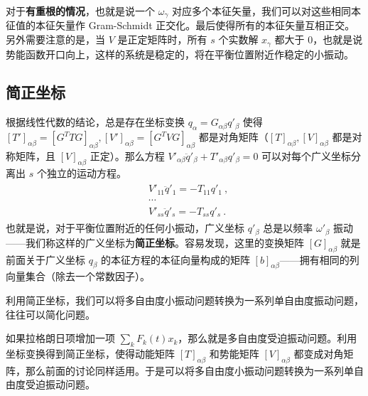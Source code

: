 对于\textbf{有重根的情况}，也就是说一个 $\omega_\gamma$ 对应多个本征矢量，我们可以对这些相同本征值的本征矢量作 Gram-Schmidt 正交化。最后使得所有的本征矢量互相正交。另外需要注意的是，当 $V$ 是正定矩阵时，所有 $s$ 个实数解 $x_\gamma$ 都大于 $0$，也就是说势能函数开口向上，这样的系统是稳定的，将在平衡位置附近作稳定的小振动。

\subsection{简正坐标}

根据线性代数的结论，总是存在坐标变换 $q_\alpha=G_{\alpha\beta}q'_\beta$ 使得 $[T']_{\alpha\beta}=[G^T T G]_{\alpha\beta},[V']_{\alpha\beta}=[G^T V G]_{\alpha\beta} $ 都是对角矩阵（$[T]_{\alpha\beta},[V]_{\alpha\beta}$ 都是对称矩阵，且 $[V]_{\alpha\beta}$ 正定）。那么方程 $V'_{\alpha\beta}\ddot{q}'_\beta+T'_{\alpha\beta}q'_\beta=0$ 可以对每个广义坐标分离出 $s$ 个独立的运动方程。
\begin{align}
\begin{matrix}
&V'_{11}\ddot{q}'_1=-T_{11}q'_1~,\\
&\cdots\\
&V'_{ss}\ddot{q}'_s=-T_{ss}q'_s~.
\end{matrix}
\end{align}
也就是说，对于平衡位置附近的任何小振动，广义坐标 $q'_\beta$ 总是以频率 $\omega'_\beta$ 振动——我们称这样的广义坐标为\textbf{简正坐标}。容易发现，这里的变换矩阵 $[G]_{\alpha\beta}$ 就是前面关于广义坐标 $q_\beta$ 的本征方程的本征向量构成的矩阵 $[b]_{\alpha\beta}$——拥有相同的列向量集合（除去一个常数因子）。

利用简正坐标，我们可以将多自由度小振动问题转换为一系列单自由度振动问题，往往可以简化问题。

如果拉格朗日项增加一项 $\sum_k F_k(t)x_k$，那么就是多自由度受迫振动问题。利用坐标变换得到简正坐标，使得动能矩阵 $[T]_{\alpha\beta}$ 和势能矩阵 $[V]_{\alpha\beta}$ 都变成对角矩阵，那么前面的讨论同样适用。于是可以将多自由度小振动问题转换为一系列单自由度受迫振动问题。